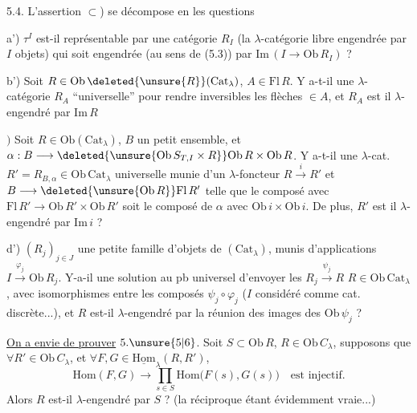 5.4. L'assertion $\subset$)
 se décompose en les questions

a') $\tau^I$ est-il représentable par une catégorie $R_I$ (la
$\lambda$-catégorie libre engendrée par $I$ objets) qui soit \inserted{$\lambda$-}engendrée
(au sens de (5.3)) par $\mathrm{Im}\,(I\longrightarrow\mathrm{Ob}\,R_I)$ ?

b') Soit  $R\in\mathrm{Ob}\,\deleted{\unsure{R}}(\mathrm{Cat}_\lambda)$, $A\in\mathrm{Fl}\,R$. Y a-t-il une
$\lambda$-catégorie $R_A$  ``universelle'' pour rendre inversibles les
flèches $\in A$, et $R_A$ est il $\lambda$-engendré par $\mathrm{Im}\,R$

$)$ Soit $R\in\mathrm{Ob}(\mathrm{Cat}_{\lambda})$, $B$ un  petit ensemble, et
$\alpha:B\longrightarrow\deleted{\unsure{\mathrm{Ob}\,S_{T,I}\times R}}\mathrm{Ob}\,R\times\mathrm{Ob}\,R$.  Y a-t-il une
$\lambda$-cat. $R'=R_{B,\alpha}\in\mathrm{Ob}\,\mathrm{Cat}_{\lambda}$ universelle  munie
d'un $\lambda$-foncteur $R\xrightarrow{i}R'$ et 
$B\longrightarrow\deleted{\unsure{\mathrm{Ob}\,R}}\mathrm{Fl}\,R'$ telle que le composé avec $\mathrm{Fl}\,R'\to\mathrm{Ob}\,R'\times\mathrm{Ob}\,R'$
soit le composé de $\alpha$ avec $\mathrm{Ob}\,i\times\mathrm{Ob}\,i$. De plus, $R'$ est il
$\lambda$-engendré par $\mathrm{Im}\,i$ ?

d')  $(R_j)_{j\in J}$ une petite famille d'objets
de $(\mathrm{Cat}_\lambda)$, munis d'applications $I\xrightarrow{\varphi_j}\mathrm{Ob}\,R_j$. Y-a-il
une solution au pb universel d'envoyer les $R_j\xrightarrow{\psi_j}R$
$R\in\mathrm{Ob}\,\mathrm{Cat}_\lambda$, avec   isomorphismes entre
les composés  $\psi_j\circ\varphi_j$ ($I$ considéré comme
cat. discrète...), et $R$ est-il $\lambda$-engendré par la
réunion des images des $\mathrm{Ob}\,\psi_j$ ?

\uline{On a envie de prouver} $5.\unsure{5|6}$. Soit $S\subset\mathrm{Ob}\,R$, $R\in\mathrm{Ob}\,C_\lambda$,
supposons que $\forall R'\in\mathrm{Ob}\,C_\lambda$, et $\forall F,G\in\underline{\mathrm{Hom}}_\lambda(R,R')$,
\[
\mathrm{Hom}(F,G)\longrightarrow\prod_{s\in S}\mathrm{Hom}\bigl(F(s),G(s)\bigr)\quad\text{est injectif.}
\]
Alors $R$ est-il $\lambda$-engendré par $S$ ? (la réciproque
étant évidemment vraie...)
